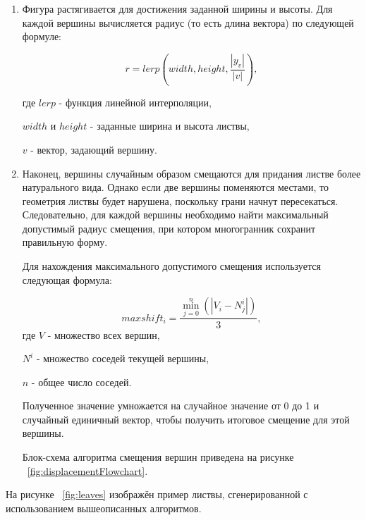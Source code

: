 \begin{enumerate}
Блок-схема алгоритма подразделения приведена на рисунке ~\ref{fig:subdivisionFlowchart}.

\begin{figure}[h]
    \centering
    \texttt{[image: subdivisionFlowchart]}
    \caption{Блок-схема алгоритма подразделения.}
    \label{fig:subdivisionFlowchart}
\end{figure}

\item Фигура растягивается для достижения заданной ширины и высоты. Для каждой вершины вычисляется радиус (то есть длина вектора) по следующей формуле:

\begin{equation}
    r = lerp\left(width, height, \frac{\left|y_{v}\right|}{|v|}\right),
\end{equation}

где $lerp$ - функция линейной интерполяции, 

$width$ и $height$ - заданные ширина и высота листвы,

$v$ - вектор, задающий вершину.

\item Наконец, вершины случайным образом смещаются для придания листве более натурального вида. Однако если две вершины поменяются местами, то геометрия листвы будет нарушена, поскольку грани начнут пересекаться. Следовательно, для каждой вершины необходимо найти максимальный допустимый радиус смещения, при котором многогранник сохранит правильную форму.

Для нахождения максимального допустимого смещения используется следующая формула:

\begin{equation}
    maxshift_{i} = \frac{\displaystyle\min_{j = 0}^n(|V_{i} - N^{i}_{j}|)}{3}, 
\end{equation}
где $V$ - множество всех вершин, 

$N^{i}$ - множество соседей текущей вершины, 

$n$ - общее число соседей.

Полученное значение умножается на случайное значение от 0 до 1 и случайный единичный вектор, чтобы получить итоговое смещение для этой вершины.

Блок-схема алгоритма смещения вершин приведена на рисунке ~\ref{fig:displacementFlowchart}. 

\end{enumerate}

На рисунке ~\ref{fig:leaves} изображён пример листвы, сгенерированной с использованием вышеописанных алгоритмов.

